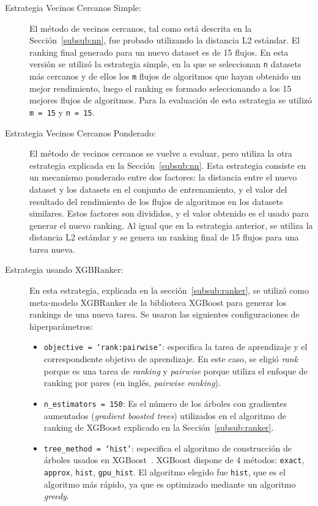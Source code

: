 \begin{description}
	\item[Estrategia Vecinos Cercanos Simple:] El método de vecinos cercanos, tal como está descrita en la Sección~\ref{subsub:nn}, fue probado utilizando la distancia L2 estándar. El ranking final generado para un nuevo dataset es de 15 flujos. En esta versión se utilizó la estrategia simple, en la que se seleccionan \texttt{n} datasets más cercanos y de ellos los \texttt{m} flujos de algoritmos que hayan obtenido un mejor rendimiento, luego el ranking es formado seleccionando a los 15 mejores flujos de algoritmos. Para la evaluación de esta estrategia se utilizó \texttt{m = 15} y \texttt{n = 15}.
	\item[Estrategia Vecinos Cercanos Ponderado:] El método de vecinos cercanos se vuelve a evaluar, pero utiliza la otra estrategia explicada en la Sección~\ref{subsub:nn}. Esta estrategia consiste en un mecanismo ponderado entre dos factores: la distancia entre el nuevo dataset y los datasets en el conjunto de entrenamiento, y el valor del resultado del rendimiento de los flujos de algoritmos en los datasets similares. Estos factores son divididos, y el valor obtenido es el usado para generar el nuevo ranking. Al igual que en la estrategia anterior, se utiliza la distancia L2 estándar y se genera un ranking final de 15 flujos para una tarea nueva.
	\item[Estrategia usando XGBRanker:] En esta estrategia, explicada en la sección~\ref{subsub:ranker}, se utilizó como meta-modelo XGBRanker de la biblioteca XGBoost para generar los rankings de una nueva tarea. Se usaron las siguientes configuraciones de hiperparámetros: 	
	\begin{itemize}
		\item \texttt{objective = `rank:pairwise'}: especifica la tarea de aprendizaje y el correspondiente objetivo de aprendizaje. En este caso, se eligió \textit{rank} porque es una tarea de \textit{ranking} y \textit{pairwise} porque utiliza el enfoque de ranking por pares (en inglés, \textit{pairwise ranking}).
		\item \texttt{n\_estimators = 150}: Es el número de los árboles con gradientes aumentados (\textit{gradient boosted trees}) utilizados en el algoritmo de ranking de XGBoost explicado en la Sección~\ref{subsub:ranker}.
		\item \texttt{tree\_method = `hist'}: especifica el algoritmo de construcción de árboles usados en XGBoost~\cite{xgboost}. XGBoost dispone de 4 métodos: \texttt{exact}, \texttt{approx}, \texttt{hist}, \texttt{gpu\_hist}. El algoritmo elegido fue \texttt{hist}, que es el algoritmo más rápido, ya que es optimizado mediante un algoritmo \textit{greedy}.

\end{itemize}
\end{description}
